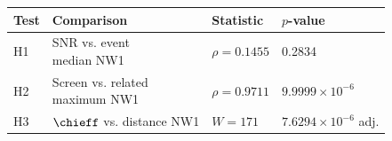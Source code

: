 \par\medskip
\noindent\begin{minipage}{\linewidth}
\begin{center}
\renewcommand{\arraystretch}{1.08}
\begin{tabular}{@{}llll@{}}
\toprule
Test & Comparison & Statistic & $p$-value \\
\midrule
H1 & \shortstack[l]{SNR vs. event\\median NW1} & $\rho=0.1455$ & 0.2834 \\
H2 & \shortstack[l]{Screen vs. related\\maximum NW1} & $\rho=0.9711$ & $9.9999\times10^{-6}$ \\
H3 & \shortstack[l]{$\chieff$ vs. distance\\NW1} & $W=171$ & $7.6294\times10^{-6}$ adj. \\
\bottomrule
\end{tabular}
\end{center}
\begin{spacing}{1.0}\end{spacing}
\tablecredit
\end{minipage}
\par\medskip
